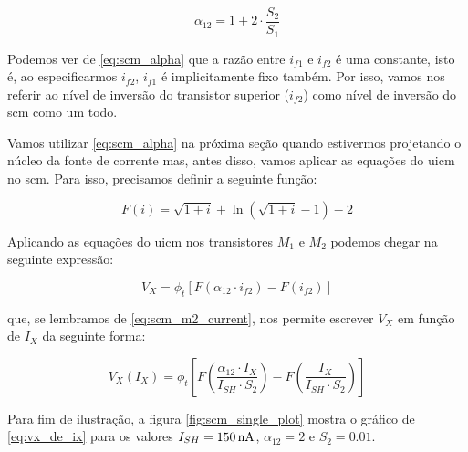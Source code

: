 \documentclass[10pt,a4paper]{extreport}
\newcommand{\?}{\stackrel{?}{=}}
\newcommand{\sis}[2]{\complexnum{#1}\,\si[per-mode=symbol]{#2}}
\begin{document}
\begin{equation}
    \label{eq:scm_alpha}
    \alpha_{12}=1+2\cdot\frac{S_2}{S_1}
\end{equation}

Podemos ver de \eqref{eq:scm_alpha} que a razão entre $i_{f1}$ e $i_{f2}$ é uma constante, isto é, ao especificarmos $i_{f2}$, $i_{f1}$ é implicitamente fixo também. Por isso, vamos nos referir ao nível de inversão do transistor superior ($i_{f2}$) como nível de inversão do \acrshort{scm} como um todo.

Vamos utilizar \eqref{eq:scm_alpha} na próxima seção quando estivermos projetando o núcleo da fonte de corrente mas, antes disso, vamos aplicar as equações do \acrfull{uicm} no \acrshort{scm}. Para isso, precisamos definir a seguinte função:

\begin{equation}
    \label{eq:uicm_function}
    F(i)=\sqrt{1+i}+\ln\left(\sqrt{1+i}-1\right)-2
\end{equation}


Aplicando as equações do \acrshort{uicm} nos transistores $M_1$ e $M_2$ podemos chegar na seguinte expressão:

\begin{equation}
    \label{eq:scm_uicm}
    V_X=\phi_t\left[F(\alpha_{12}\cdot i_{f2})-F(i_{f2})\right]
\end{equation}

\noindent que, se lembramos de \eqref{eq:scm_m2_current}, nos permite escrever $V_X$ em função de $I_X$ da seguinte forma:

\begin{equation}
    \label{eq:vx_de_ix}
    V_X(I_X)=\phi_t\left[F\left(\frac{\alpha_{12}\cdot I_X}{I_{SH}\cdot S_2}\right)-F\left(\frac{I_X}{I_{SH}\cdot S_2}\right)\right]
\end{equation}

Para fim de ilustração, a figura \ref{fig:scm_single_plot} mostra o gráfico de \eqref{eq:vx_de_ix} para os valores $I_{SH}=\sis{150}{\nano\ampere}$, $\alpha_{12}=2$ e $S_2=\num{0.01}$.
\end{document}
